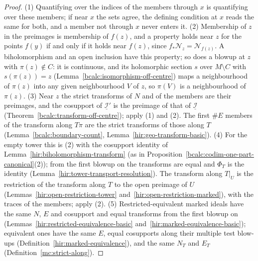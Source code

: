 \begin{proof}
\mixedleanok
(1) Quantifying over the indices of the members through \(x\) is quantifying over these members; if near \(x\) the sets agree, the defining condition at \(x\)
reads the same for both, and a member not through \(x\) never enters it. (2) Membership of \(z\) in the preimages is membership of \(f(z)\), and a property
holds near \(z\) for the points \(f(y)\) if and only if it holds near \(f(z)\), since \(f_*\mathcal N_z=\mathcal N_{f(z)}\). A biholomorphism and an open inclusion have
this property; so does a blowup at \(z\) with \(\pi(z)\notin C\): it is continuous, and its holomorphic section \(s\) over \(M\setminus C\) with \(s(\pi(z))=z\)
(Lemma~\ref{bcalc:isomorphism-off-centre}) maps a neighbourhood of \(\pi(z)\) into any given neighbourhood \(V\) of \(z\), so \(\pi(V)\) is a neighbourhood of \(\pi(z)\).
(3) Near \(z\) the strict transforms of \(N\) and of the members are their preimages, and the cosupport of \(\underline{\mathcal I}'\) is the preimage of that of
\(\underline{\mathcal I}\) (Theorem~\ref{bcalc:transform-off-centre}); apply (1) and (2). The first \(\#E\) members of the transform along \(T\pi\) are the strict transforms
of those along \(T\) (Lemma~\ref{bcalc:boundary-count}, Lemma~\ref{hir:geo-transform-basic}). (4) For the empty tower this is (2) with the cosupport identity of
Lemma~\ref{hir:biholomorphism-transform} (as in Proposition~\ref{bcalc:codim-one-part-canonical}(2)); from the first blowup on the transforms are equal and \(\Phi_T\) is
the identity (Lemma~\ref{hir:tower-transport-resolution}). The transform along \(T|_U\) is the restriction of the transform along \(T\) to the open preimage of \(U\)
(Lemmas~\ref{hir:open-restriction-tower} and~\ref{hir:open-restriction-marked}), with the traces of the members; apply (2). (5) Restricted-equivalent marked ideals have
the same \(N\), \(E\) and cosupport and equal transforms from the first blowup on (Lemmas~\ref{hir:restricted-equivalence-basic} and~\ref{hir:marked-equivalence-basic});
equivalent ones have the same \(E\), equal cosupports along their multiple test blow-ups (Definition~\ref{hir:marked-equivalence}), and the same \(N_T\) and \(E_T\)
(Definition~\ref{mc:strict-along}).
\end{proof}

